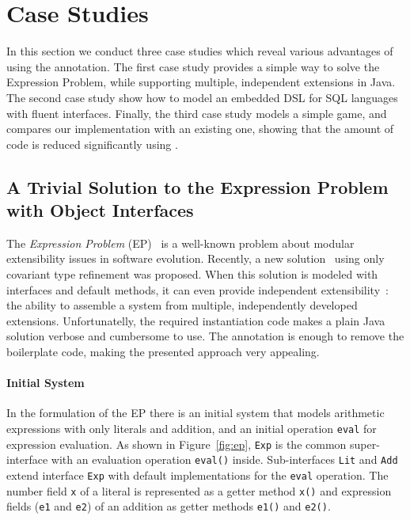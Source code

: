 \section{Case Studies}
In this section we conduct three case studies which reveal various
advantages of using the \mixin annotation. The first case study provides a
simple way to solve the Expression Problem, while supporting multiple,
independent extensions in Java.  The second case study show how to model an
embedded DSL for SQL languages with fluent interfaces. Finally, the third 
case study models a simple game, and compares our implementation with an 
existing one, showing that the amount of code is reduced significantly using \mixin.

\subsection{A Trivial Solution to the Expression Problem with Object Interfaces}

The \emph{Expression Problem} (EP)~\cite{wadler98expression} is a well-known
problem about modular extensibility issues in software evolution. Recently, a
new solution~\cite{eptrivially} using only covariant type refinement was
proposed. When this solution is modeled with interfaces and default methods, it
can even provide independent extensibility~\cite{zenger05independentlyextensible}: the ability to assemble a system
from multiple, independently developed extensions. Unfortunatelly, the
required instantiation code makes a plain Java solution verbose and cumbersome
to use. The \mixin annotation is enough to remove the boilerplate code, making
the presented approach very appealing.

\paragraph{Initial System}
In the formulation of the EP there is an initial system that models
arithmetic expressions with only literals and addition, and an initial 
operation \texttt{eval} for expression evaluation.
As shown in Figure~\ref{fig:ep}, \texttt{Exp} is the common
super-interface with an evaluation operation \texttt{eval()}
inside. Sub-interfaces \texttt{Lit} and \texttt{Add} extend interface
\texttt{Exp} with default implementations for the \texttt{eval} operation. The
number field \texttt{x} of a literal is represented as a getter method
\texttt{x()} and expression fields (\texttt{e1} and \texttt{e2}) of an addition
as getter methods \texttt{e1()} and \texttt{e2()}.

